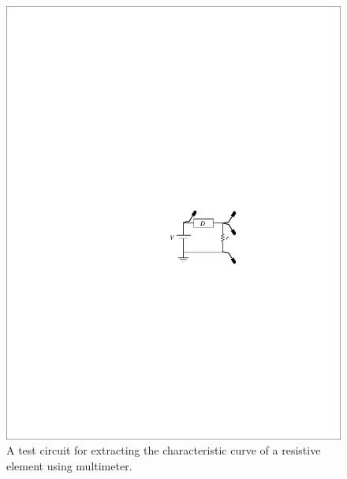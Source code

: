 \documentclass[11pt]{article}
\begin{document}

\begin{question}


    \begin{figure}[H]
        \centering
        \includegraphics[scale=1.2,angle=0]{Fig/cir2.pdf}
        \caption{A test circuit for extracting the characteristic curve of a resistive element using multimeter.} \label{fig:cir2}
    \end{figure}


\end{question}
\end{document}
